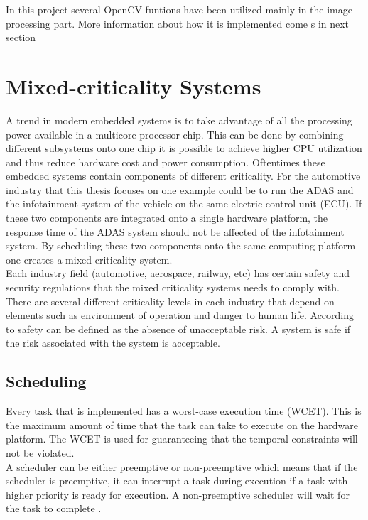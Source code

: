 In this project several OpenCV funtions have been utilized mainly in the image processing part. More information about how it is implemented come s in next section \cite{opencv}

\section{Mixed-criticality Systems}
A trend in modern embedded systems is to take advantage of all the processing power available in a multicore processor chip. This can be done by combining different subsystems onto one chip it is possible to  achieve higher CPU utilization and thus reduce hardware cost and power consumption. Oftentimes these embedded systems contain components of different criticality. For the automotive industry that this thesis focuses on one example could be to run the ADAS and the infotainment system of the vehicle on the same electric control unit (ECU). If these two components are integrated onto a single hardware platform, the response time of the ADAS system should not be affected of the infotainment system. By scheduling these two components onto the same computing platform one creates a mixed-criticality system.\\

Each industry field (automotive, aerospace, railway, etc) has certain safety and security regulations that the mixed criticality systems needs to comply with. There are several different criticality levels in each industry that depend on elements such as environment of operation and danger to human life\cite{zaki2016}. According to \cite{SIL} safety can be defined as the absence of unacceptable risk. A system is safe if the risk associated with the system is acceptable. 


\subsection{Scheduling}
Every task that is implemented has a worst-case execution time (WCET). This is the maximum amount of time that the task can take to execute on the hardware platform. The WCET is used for guaranteeing that the temporal constraints will not be violated.\\

A scheduler can be either preemptive or non-preemptive which means that if the scheduler is preemptive, it can interrupt a task during execution if a task with higher priority is ready for execution. A non-preemptive scheduler will wait for the task to complete \cite{RTSS}.

